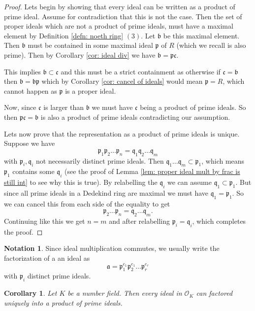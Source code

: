\documentclass[11pt,a4paper]{report}
\theoremstyle{plain}
\newtheorem{cor}[subsection]{Corollary}
\theoremstyle{definition}
\theoremstyle{definition}
\newtheorem{nota}[subsection]{Notation}
\def\gothb{\mathfrak{b}}
\def\gothc{\mathfrak{c}}
\def\gothp{\mathfrak{p}}
\def\gothq{\mathfrak{q}}
\def \OO {\mathcal{O}}
\def\gotha{\mathfrak{a}}
\begin{document}
\begin{proof}
Lets begin by showing that every ideal can be written as a product of prime ideal. Assume for contradiction that this is not the case. Then the set of proper ideals which are not a product of prime ideals, must have a maximal element by Definition \ref{defn: noeth ring} $(3)$. Let $\gothb$ be this maximal element. Then $\gothb$ must be contained in some maximal ideal $\gothp$ of $R$ (which we recall is also prime). Then by Corollary \ref{cor: ideal div} we have $\gothb=\gothp \gothc$. 

This implies $\gothb \subset \gothc$ and this must be a strict containment as otherwise if $\gothc=\gothb$ then $\gothb=\gothb\gothp$ which by Corollary \ref{cor: cancel of ideals}  would mean $\gothp=R$, which cannot happen as $\gothp$ is a proper ideal. 

Now, since $\gothc$ is larger than $\gothb$ we must have $\gothc$ being a product of prime ideals. So then $\gothp\gothc=\gothb$ is also a product of prime ideals contradicting our assumption. 

Lets now prove that the representation as a product of prime ideals is unique. Suppose we have \[\gothp_1\gothp_2\dots\gothp_n=\gothq_1\gothq_2\dots\gothq_m\] with $\gothp_i,\gothq_i$ not necessarily distinct prime ideals. Then $\gothq_1\dots\gothq_m  \subset \gothp_1$, which means $\gothp_1$ contains some $\gothq_i$  (see the proof of Lemma \ref{lem: proper ideal mult by frac is still int} to see why this is true). By relabelling the $\gothq_i$ we can assume $\gothq_1 \subset \gothp_1$. But since all prime ideals in a Dedekind ring are maximal we must have $\gothq_1=\gothp_1$. So we can cancel this from each side of the equality to get \[\gothp_2\dots\gothp_n=\gothq_2\dots\gothq_m.\] Continuing like this we get $n=m$ and after relabelling $\gothp_i=\gothq_i$, which completes the proof.




\end{proof}

\begin{nota}
Since ideal multiplication commutes, we usually write the factorization of a an ideal as \[\gotha=\gothp_1^{e_1}\gothp_2^{e_1}\dots\gothp_r^{e_r}\] with $\gothp_i$ distinct prime ideals. 
\end{nota}

\begin{cor}
Let $K$ be a number field. Then every ideal in $\OO_K$ can factored uniquely into a product of prime ideals.
\end{cor}
\end{document}
